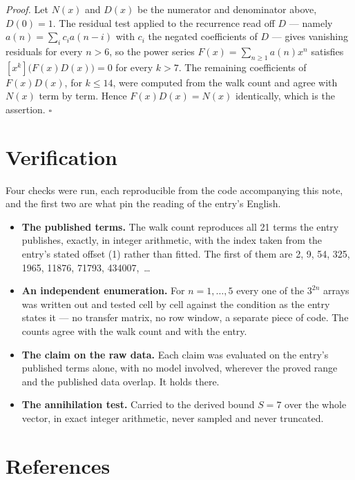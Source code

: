 \documentclass[11pt]{article}
\theoremstyle{definition}
\begin{document}
{\itshape Proof.} Let $N(x)$ and $D(x)$ be the numerator and denominator above, $D(0)=1$. The residual test applied to the recurrence read off $D$ --- namely $a(n) = \sum_i c_i a(n-i)$ with $c_i$ the negated coefficients of $D$ --- gives vanishing residuals for every $n > 6$, so the power series $F(x)=\sum_{n\ge 1}a(n)x^n$ satisfies $[x^k]\bigl(F(x)D(x)\bigr) = 0$ for every $k > 7$. The remaining coefficients of $F(x)D(x)$, for $k \le 14$, were computed from the walk count and agree with $N(x)$ term by term. Hence $F(x)D(x) = N(x)$ identically, which is the assertion. $\square$

\section{Verification}

Four checks were run, each reproducible from the code accompanying this note, and the first two are what pin the reading of the entry's English.

\begin{itemize}

\item {\bfseries The published terms.} The walk count reproduces all 21 terms the entry publishes, exactly, in integer arithmetic, with the index taken from the entry's stated offset (1) rather than fitted. The first of them are 2, 9, 54, 325, 1965, 11876, 71793, 434007,~\dots

\item {\bfseries An independent enumeration.} For $n = 1,\dots,5$ every one of the $3^{2n}$ arrays was written out and tested cell by cell against the condition as the entry states it --- no transfer matrix, no row window, a separate piece of code. The counts agree with the walk count and with the entry.

\item {\bfseries The claim on the raw data.} Each claim was evaluated on the entry's published terms alone, with no model involved, wherever the proved range and the published data overlap. It holds there.

\item {\bfseries The annihilation test.} Carried to the derived bound $S = 7$ over the whole vector, in exact integer arithmetic, never sampled and never truncated.

\end{itemize}

\section{References}
\end{document}
